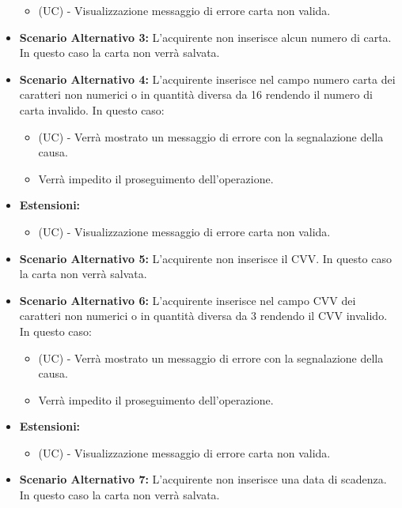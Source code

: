 \begin{itemize}
    \begin{itemize}
        \item (UC) - Visualizzazione messaggio di errore carta non valida.
    \end{itemize}
    \item \textbf{Scenario Alternativo 3:} L'acquirente non inserisce alcun numero di carta. In questo caso la carta non verrà salvata.
    \item \textbf{Scenario Alternativo 4:} L'acquirente inserisce nel campo numero carta dei caratteri non numerici o in quantità diversa da 16 rendendo il numero di carta invalido. In questo caso:
    \begin{itemize}
        \item (UC) - Verrà mostrato un messaggio di errore con la segnalazione della causa.
        \item Verrà impedito il proseguimento dell'operazione.
    \end{itemize}
    \item \textbf{Estensioni:}
    \begin{itemize}
        \item (UC) - Visualizzazione messaggio di errore carta non valida.
    \end{itemize}
    \item \textbf{Scenario Alternativo 5:} L'acquirente non inserisce il CVV. In questo caso la carta non verrà salvata.
    \item \textbf{Scenario Alternativo 6:} L'acquirente inserisce nel campo CVV dei caratteri non numerici o in quantità diversa da 3 rendendo il CVV invalido. In questo caso:
    \begin{itemize}
        \item (UC) - Verrà mostrato un messaggio di errore con la segnalazione della causa.
        \item Verrà impedito il proseguimento dell'operazione.
    \end{itemize}
    \item \textbf{Estensioni:}
    \begin{itemize}
        \item (UC) - Visualizzazione messaggio di errore  carta non valida.
    \end{itemize}
    \item \textbf{Scenario Alternativo 7:} L'acquirente non inserisce una data di scadenza. In questo caso la carta non verrà salvata.
\end{itemize}

